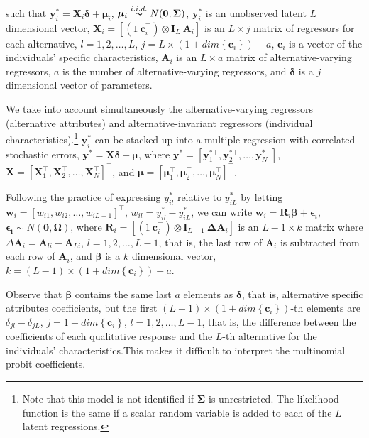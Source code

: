 such that $\bm{y}_i^*=\bm{X}_{i}\bm{\delta}+\bm\mu_i$, $\bm\mu_i\stackrel{i.i.d.} {\thicksim}N(\bm 0,\bm{\Sigma})$, $\bm{y}_i^*$ is an unobserved latent $L$ dimensional vector, $\bm{X}_{i}=\left[(1 \ \bm{c}_i^{\top})\otimes \bm{I}_L \ \bm{A}_i\right]$ is an $L\times j$ matrix of regressors for each alternative, $l=1,2,\dots,L$, $j=L\times (1+dim\left\{\bm{c}_i\right\})+a$, $\bm{c}_i$ is a vector of the individuals' specific characteristics, $\bm{A}_i$ is an $L\times a$ matrix of alternative-varying regressors, $a$ is the number of alternative-varying regressors, and $\bm{\delta}$ is a $j$ dimensional vector of parameters.

We take into account simultaneously the alternative-varying regressors (alternative attributes) and alternative-invariant regressors (individual characteristics).\footnote{Note that this model is not identified if $\bm{\Sigma}$ is unrestricted. The likelihood function is the same if a scalar random variable is added to each of the $L$ latent regressions.} $\bm{y}_i^*$ can be stacked up into a multiple regression with correlated stochastic errors, $\bm{y}^*=\bm{X}\bm\delta+\bm{\mu}$, where $\bm{y}^*=\left[\bm{y}_1^{*\top},\bm{y}_2^{*\top},\dots,\bm{y}_N^{*\top}\right]$,$\bm{X}=\left[\bm{X}_1^{\top},\bm{X}_2^{\top},\dots,\bm{X}_N^{\top}\right]^{\top}$, and $\bm{\mu}=\left[\bm{\mu}_1^{\top},\bm{\mu}_2^{\top},\dots,\bm{\mu}_N^{\top}\right]^{\top}$.

Following the practice of expressing $y_{il}^*$ relative to $y_{iL}^*$ by letting $\bm{w}_i=\left[w_{i1},w_{i2},\dots,w_{iL-1}\right]^{\top}$, $w_{il}=y_{il}^*-y_{iL}^*$, we can write $\bm{w}_i=\bm{R}_i\bm{\beta}+\bm{\epsilon}_i$, $\bm{\epsilon_i}\sim{N}(\bm 0,\bm{\Omega})$, where $\bm{R}_i=\left[(1 \ \bm{c}_i^{\top})\otimes \bm{I}_{L-1} \ \bm{\Delta A}_i\right]$ is an $L-1\times k$ matrix where $\Delta \bm{A}_i=\bm{A}_{li}-\bm{A}_{Li}$, $l=1,2, \dots, L-1$, that is, the last row of $\bm{A}_i$ is subtracted from each row of $\bm{A}_i$, and ${\bm{\beta}}$ is a $k$ dimensional vector, $k=(L-1)\times(1+dim\left\{\bm{c}_i\right\})+a$.

Observe that $\bm{\beta}$ contains the same last $a$ elements as $\bm{\delta}$, that is, alternative specific attributes coefficients, but the first $(L-1)\times(1+dim\left\{\bm{c}_i\right\})$-th elements are $\delta_{jl}-\delta_{jL}$, $j=1+dim\left\{\bm{c}_i\right\}$, $l=1,2,\dots,L-1$, that is, the difference between the coefficients of each qualitative response and the $L$-th alternative for the individuals' characteristics.This makes it difficult to interpret the multinomial probit coefficients.

